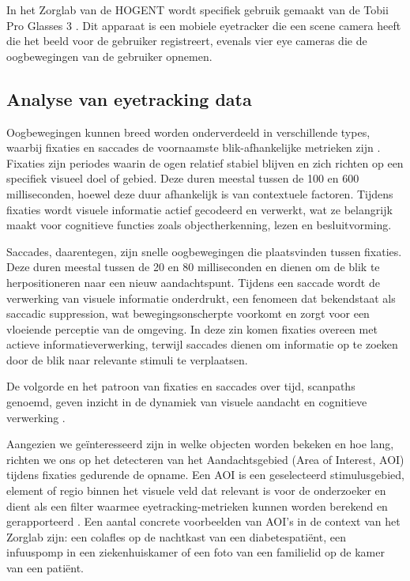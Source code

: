 In het Zorglab van de HOGENT wordt specifiek gebruik gemaakt van de Tobii Pro Glasses 3 \autocite{Tobii2025a}. 
Dit apparaat is een mobiele eyetracker die een scene camera heeft die het beeld voor de gebruiker registreert, evenals vier eye cameras die de oogbewegingen van de gebruiker opnemen.

\subsection{Analyse van eyetracking data}

Oogbewegingen kunnen breed worden onderverdeeld in verschillende types, waarbij fixaties en saccades de voornaamste blik-afhankelijke metrieken zijn \autocite{Pauszek2023}.
Fixaties zijn periodes waarin de ogen relatief stabiel blijven en zich richten op een specifiek visueel doel of gebied.
Deze duren meestal tussen de 100 en 600 milliseconden, hoewel deze duur afhankelijk is van contextuele factoren.
Tijdens fixaties wordt visuele informatie actief gecodeerd en verwerkt, wat ze belangrijk maakt voor cognitieve functies zoals objectherkenning, lezen en besluitvorming.

Saccades, daarentegen, zijn snelle oogbewegingen die plaatsvinden tussen fixaties.
Deze duren meestal tussen de 20 en 80 milliseconden en dienen om de blik te herpositioneren naar een nieuw aandachtspunt.
Tijdens een saccade wordt de verwerking van visuele informatie onderdrukt, een fenomeen dat bekendstaat als saccadic suppression, wat bewegingsonscherpte voorkomt en zorgt voor een vloeiende perceptie van de omgeving.
In deze zin komen fixaties overeen met actieve informatieverwerking, terwijl saccades dienen om informatie op te zoeken door de blik naar relevante stimuli te verplaatsen.

De volgorde en het patroon van fixaties en saccades over tijd, scanpaths genoemd, geven inzicht in de dynamiek van visuele aandacht en cognitieve verwerking \autocite{Pauszek2023}.

Aangezien we geïnteresseerd zijn in welke objecten worden bekeken en hoe lang, richten we ons op het detecteren van het Aandachtsgebied (Area of Interest, AOI) tijdens fixaties gedurende de opname.
Een AOI is een geselecteerd stimulusgebied, element of regio binnen het visuele veld dat relevant is voor de onderzoeker en dient als een filter waarmee eyetracking-metrieken kunnen worden berekend en gerapporteerd \autocite{Pauszek2023}.
Een aantal concrete voorbeelden van AOI's in de context van het Zorglab zijn: een colafles op de nachtkast van een diabetespatiënt, een infuuspomp in een ziekenhuiskamer of een foto van een familielid op de kamer van een patiënt.

